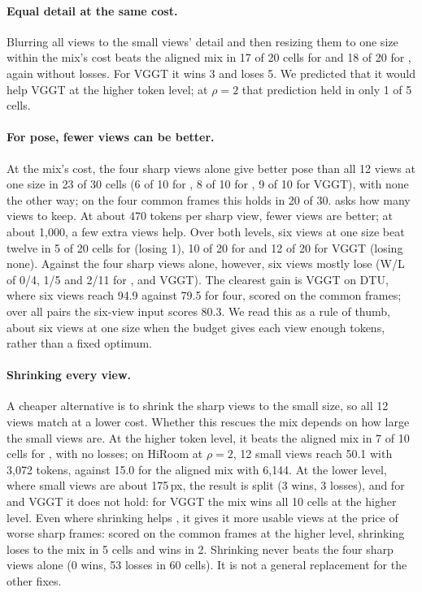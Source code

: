 \paragraph{Equal detail at the same cost.}
Blurring all views to the small views' detail and then resizing them to one size within the mix's cost beats the aligned mix in 17 of 20 cells for \pithree and 18 of 20 for \dathree, again without losses. For VGGT it wins 3 and loses 5. We predicted that it would help VGGT at the higher token level; at $\rho{=}2$ that prediction held in only 1 of 5 cells.

\paragraph{For pose, fewer views can be better.}
At the mix's cost, the four sharp views alone give better pose than all 12 views at one size in 23 of 30 cells (6 of 10 for \pithree, 8 of 10 for \dathree, 9 of 10 for VGGT), with none the other way; on the four common frames this holds in 20 of 30.  asks how many views to keep. At about 470 tokens per sharp view, fewer views are better; at about 1{,}000, a few extra views help. Over both levels, six views at one size beat twelve in 5 of 20 cells for \pithree (losing 1), 10 of 20 for \dathree and 12 of 20 for VGGT (losing none). Against the four sharp views alone, however, six views mostly lose (W/L of 0/4, 1/5 and 2/11 for \pithree, \dathree and VGGT). The clearest gain is VGGT on DTU, where six views reach 94.9 \auc against 79.5 for four, scored on the common frames; over all pairs the six-view input scores 80.3. We read this as a rule of thumb, about six views at one size when the budget gives each view enough tokens, rather than a fixed optimum.

\paragraph{Shrinking every view.}
A cheaper alternative is to shrink the sharp views to the small size, so all 12 views match at a lower cost. Whether this rescues the mix depends on how large the small views are. At the higher token level, it beats the aligned mix in 7 of 10 cells for \pithree, with no losses; on HiRoom at $\rho{=}2$, 12 small views reach 50.1 \auc with 3{,}072 tokens, against 15.0 for the aligned mix with 6{,}144. At the lower level, where small views are about 175\,px, the result is split (3 wins, 3 losses), and for \dathree and VGGT it does not hold: for VGGT the mix wins all 10 cells at the higher level. Even where shrinking helps \pithree, it gives it more usable views at the price of worse sharp frames: scored on the common frames at the higher level, shrinking loses to the mix in 5 cells and wins in 2. Shrinking never beats the four sharp views alone (0 wins, 53 losses in 60 cells). It is not a general replacement for the other fixes.


